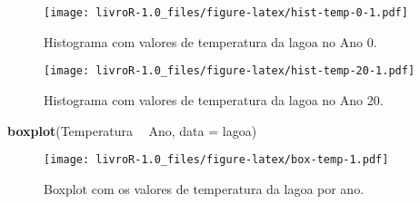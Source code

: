 \documentclass[]{book}
\newenvironment{Shaded}{\begin{snugshade}}{\end{snugshade}}
\newcommand{\DataTypeTok}[1]{\textcolor[rgb]{0.13,0.29,0.53}{#1}}
\newcommand{\DecValTok}[1]{\textcolor[rgb]{0.00,0.00,0.81}{#1}}
\newcommand{\KeywordTok}[1]{\textcolor[rgb]{0.13,0.29,0.53}{\textbf{#1}}}
\newcommand{\NormalTok}[1]{#1}
\newcommand{\OperatorTok}[1]{\textcolor[rgb]{0.81,0.36,0.00}{\textbf{#1}}}
\newcommand{\StringTok}[1]{\textcolor[rgb]{0.31,0.60,0.02}{#1}}
\begin{document}
\begin{Shaded}
\end{Shaded}

\begin{figure}
\centering
\texttt{[image: livroR-1.0\_files/figure-latex/hist-temp-0-1.pdf]}
\caption{\label{fig:hist-temp-0}Histograma com valores de temperatura da lagoa no Ano 0.}
\end{figure}

\begin{Shaded}
\end{Shaded}

\begin{figure}
\centering
\texttt{[image: livroR-1.0\_files/figure-latex/hist-temp-20-1.pdf]}
\caption{\label{fig:hist-temp-20}Histograma com valores de temperatura da lagoa no Ano 20.}
\end{figure}

\begin{Shaded}
\begin{Highlighting}[]
\KeywordTok{boxplot}\NormalTok{(Temperatura }\OperatorTok{~}\StringTok{ }\NormalTok{Ano, }\DataTypeTok{data =}\NormalTok{ lagoa)}
\end{Highlighting}
\end{Shaded}

\begin{figure}
\centering
\texttt{[image: livroR-1.0\_files/figure-latex/box-temp-1.pdf]}
\caption{\label{fig:box-temp}Boxplot com os valores de temperatura da lagoa por ano.}
\end{figure}
\end{document}
